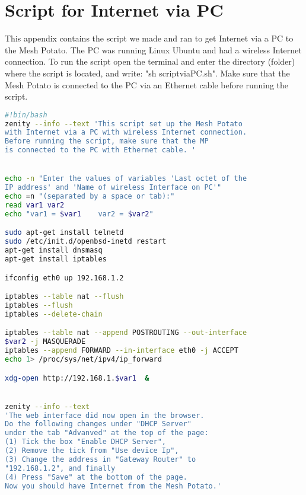 \chapter{Script for Internet via PC}
\label{chp:appendixD} 

This appendix contains the script we made and ran to get Internet via a PC to the Mesh Potato. The PC was running Linux Ubuntu and had a wireless Internet connection. To run the script open the terminal and enter the directory (folder) where the script is located, and write: "sh scriptviaPC.sh". Make sure that the Mesh Potato is connected to the PC via an Ethernet cable before running the script. 

\begin{framed}
\noindent
\lstset{showstringspaces=false}
\begin{lstlisting}[language=sh]
#!bin/bash
zenity --info --text 'This script set up the Mesh Potato
with Internet via a PC with wireless Internet connection. 
Before running the script, make sure that the MP 
is connected to the PC with Ethernet cable. '


echo -n "Enter the values of variables 'Last octet of the
IP address' and 'Name of wireless Interface on PC'"
echo =n "(separated by a space or tab):"
read var1 var2
echo "var1 = $var1    var2 = $var2"

sudo apt-get install telnetd
sudo /etc/init.d/openbsd-inetd restart
apt-get install dnsmasq
apt-get install iptables 

ifconfig eth0 up 192.168.1.2

iptables --table nat --flush
iptables --flush
iptables --delete-chain

iptables --table nat --append POSTROUTING --out-interface 
$var2 -j MASQUERADE
iptables --append FORWARD --in-interface eth0 -j ACCEPT
echo 1> /proc/sys/net/ipv4/ip_forward

xdg-open http://192.168.1.$var1  &


zenity --info --text 
'The web interface did now open in the browser. 
Do the following changes under "DHCP Server" 
under the tab "Advanved" at the top of the page:
(1) Tick the box "Enable DHCP Server",
(2) Remove the tick from "Use device Ip", 
(3) Change the address in "Gateway Router" to 
"192.168.1.2", and finally 
(4) Press "Save" at the bottom of the page. 
Now you should have Internet from the Mesh Potato.'

\end{lstlisting}
\end{framed}

